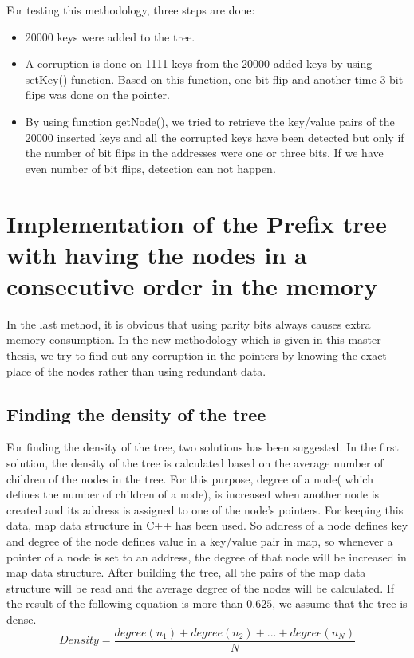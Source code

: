 \documentclass[12pt]{report}
\begin{document}
For testing this methodology, three steps are done:
\begin{itemize}
\item 20000 keys were added to the tree. 
\item A corruption is done on 1111 keys from the 20000 added keys by using setKey() function. Based on this function, one bit flip and another time 3 bit flips was done on the pointer.  
\item By using function getNode(), we tried to retrieve the key/value pairs of the 20000 inserted keys and all the corrupted keys have been detected but only if the number of bit flips in the addresses were one or three bits. If we have even number of bit flips, detection can not happen.  
\end{itemize}


\section{Implementation of the Prefix tree with having the nodes in a consecutive order in the memory}   

In the last method, it is obvious that using parity bits always causes extra memory consumption. In the new methodology which is given in this master thesis, we try to find out any corruption in the pointers by knowing the exact place of the nodes rather than using redundant data. 

\subsection{Finding the density of the tree}

For finding the density of the tree, two solutions has been suggested. In the first solution, the density of the tree is calculated based on the average number of children of the nodes in the tree. For this purpose, degree of a node( which defines the number of children of a node), is increased when another node is created and its address is assigned to one of the node's pointers. For keeping this data, map data structure in C++ has been used. So address of a node defines key and degree of the node defines value in a key/value pair in map, so whenever a pointer of a node is set to an address, the degree of that node will be increased in map data structure. After building the tree, all the pairs of the map data structure will be read and the average degree of the nodes will be calculated. If the result of the following equation is more than $0.625$, we assume that the tree is dense. 
\begin{equation}
Density = \frac{degree(n_1)+degree(n_2)+...+degree(n_N)}{N}
\end{equation}   
\end{document}
